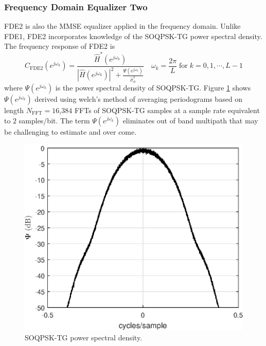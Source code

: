 \subsubsection{Frequency Domain Equalizer Two}
FDE2 is also the MMSE equalizer applied in the frequency domain.
Unlike FDE1, FDE2 incorporates knowledge of the SOQPSK-TG power spectral density.
The frequency response of FDE2 is \cite[eq. (12)]{williams2013linear}
\begin{equation}
C_\text{FDE2}(e^{j\omega_k}) = \frac{\hat{H}^\ast(e^{j\omega_k})}  {|\hat{H}(e^{j\omega_k})|^2  +  \frac{\Psi(e^{j\omega_k})}{\hat{\sigma}^2_w}} \quad
\omega_k = \frac{2\pi}{L} \;
\text{for} \;
k=0,1,\cdots,L-1
\label{eq:FDE2}
\end{equation}
where $\Psi(e^{j\omega_k})$ is the power spectral density of SOQPSK-TG.
Figure \ref{fig:SOQPSK_spectrum} shows $\Psi(e^{j\omega_k})$ derived using welch's method of averaging periodograms based on length $N_\text{FFT} = 16$,$384$ FFTs of SOQPSK-TG samples at a sample rate equivalent to $2$ samples/bit.
The term $\Psi(e^{j\omega_k})$ eliminates out of band multipath that may be challenging to estimate and over come.
\begin{figure}
	\centering\includegraphics[width=5in]{figures/eq_equations/FDE2_spectrum_PSI.eps}
	\caption{SOQPSK-TG power spectral density.}
	\label{fig:SOQPSK_spectrum}
\end{figure}
